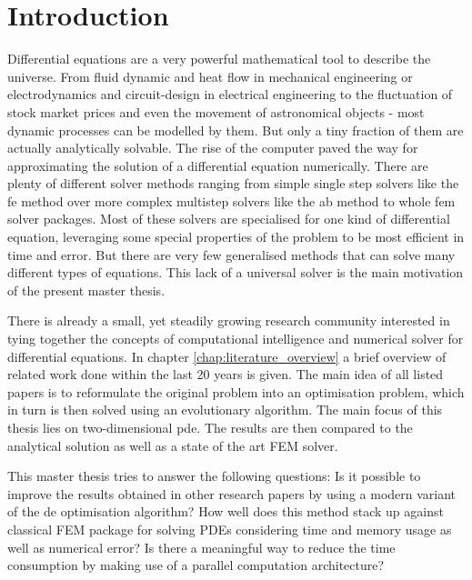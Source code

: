 \documentclass[./\jobname.tex]{subfiles}
\begin{document}
\chapter{Introduction}

Differential equations are a very powerful mathematical tool to describe the universe. From fluid dynamic and heat flow in mechanical engineering or electrodynamics and circuit-design in electrical engineering to the fluctuation of stock market prices and even the movement of astronomical objects - most dynamic processes can be modelled by them. But only a tiny fraction of them are actually analytically solvable. The rise of the computer paved the way for approximating the solution of a differential equation numerically. There are plenty of different solver methods ranging from simple single step solvers like the \gls{fe} method over more complex multistep solvers like the \gls{ab} method to whole \gls{fem} solver packages. Most of these solvers are specialised for one kind of differential equation, leveraging some special properties of the problem to be most efficient in time and error. But there are very few generalised methods that can solve many different types of equations. This lack of a universal solver is the main motivation of the present master thesis.

There is already a small, yet steadily growing research community interested in tying together the concepts of computational intelligence and numerical solver for differential equations. In chapter \ref{chap:literature_overview} a brief overview of related work done within the last 20 years is given. The main idea of all listed papers is to reformulate the original problem into an optimisation problem, which in turn is then solved using an evolutionary algorithm. The main focus of this thesis lies on two-dimensional \gls{pde}. The results are then compared to the analytical solution as well as a state of the art FEM solver.  

This master thesis tries to answer the following questions: 
Is it possible to improve the results obtained in other research papers by using a modern variant of the \gls{de} optimisation algorithm? How well does this method stack up against classical FEM package for solving PDEs considering time and memory usage as well as numerical error? Is there a meaningful way to reduce the time consumption by making use of a parallel computation architecture? 
\end{document}
